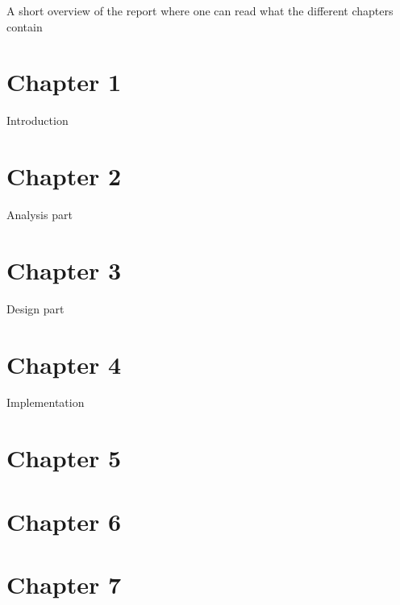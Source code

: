 A short overview of the report where one can read what the different chapters contain

\section*{Chapter 1}
Introduction
\section*{Chapter 2}
Analysis part
\section*{Chapter 3}
Design part
\section*{Chapter 4}
Implementation
\section*{Chapter 5}
\section*{Chapter 6}
\section*{Chapter 7}